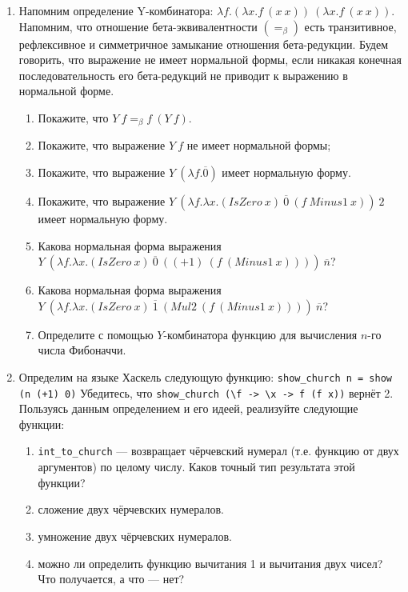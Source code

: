\documentclass[10pt,a4paper,oneside]{article}
\begin{document}
\begin{enumerate}
\item Напомним определение Y-комбинатора: $\lambda f.(\lambda x.f\ (x\ x))\ (\lambda x.f\ (x\ x))$.
Напомним, что отношение бета-эквивалентности $(=_\beta)$ есть транзитивное, рефлексивное и симметричное
замыкание отношения бета-редукции. Будем говорить, что выражение не имеет нормальной формы, если
никакая конечная последовательность его бета-редукций не приводит к выражению в нормальной форме.
\begin{enumerate}
\item Покажите, что $Y\ f =_\beta f\ (Y\ f)$.
\item Покажите, что выражение $Y\ f$ не имеет нормальной формы;
\item Покажите, что выражение $Y\ (\lambda f.\overline{0})$ имеет нормальную форму.
\item Покажите, что выражение $Y\ (\lambda f.\lambda x.(IsZero\ x)\ \overline{0}\ (f\ Minus1\ x))\ 2$ имеет нормальную форму.
\item Какова нормальная форма выражения $Y\ (\lambda f.\lambda x.(IsZero\ x)\ \overline{0}\ ((+1)\ (f\ (Minus1\ x))))\ \overline{n}$?
\item Какова нормальная форма выражения $Y\ (\lambda f.\lambda x.(IsZero\ x)\ \overline{1}\ (Mul2\ (f\ (Minus1\ x))))\ \overline{n}$?
\item Определите с помощью $Y$-комбинатора функцию для вычисления $n$-го числа Фибоначчи.
\end{enumerate}

\item Определим на языке Хаскель следующую функцию: \verb!show_church n = show (n (+1) 0)!
Убедитесь, что \verb!show_church (\f -> \x -> f (f x))! вернёт 2. 
Пользуясь данным определением и его идеей, реализуйте следующие функции:

\begin{enumerate}
\item \verb!int_to_church! --- возвращает чёрчевский нумерал (т.е. функцию от двух аргументов) по целому числу.
Каков точный тип результата этой функции?
\item сложение двух чёрчевских нумералов.
\item умножение двух чёрчевских нумералов.
\item можно ли определить функцию вычитания 1 и вычитания двух чисел? Что получается, а что --- нет?
\end{enumerate}


\end{enumerate}
\end{document}
